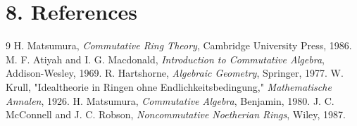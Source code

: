 \section*{8. References}


\begin{thebibliography}{9}
 H. Matsumura, \emph{Commutative Ring Theory}, Cambridge University Press, 1986.
 M. F. Atiyah and I. G. Macdonald, \emph{Introduction to Commutative Algebra}, Addison-Wesley, 1969.
 R. Hartshorne, \emph{Algebraic Geometry}, Springer, 1977.
 W. Krull, "Idealtheorie in Ringen ohne Endlichkeitsbedingung," \emph{Mathematische Annalen}, 1926.
 H. Matsumura, \emph{Commutative Algebra}, Benjamin, 1980.
 J. C. McConnell and J. C. Robson, \emph{Noncommutative Noetherian Rings}, Wiley, 1987.
\end{thebibliography}
